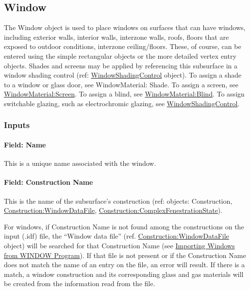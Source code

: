 \subsection{Window}\label{window}

The Window object is used to place windows on surfaces that can have windows, including exterior walls, interior walls, interzone walls, roofs, floors that are exposed to outdoor conditions, interzone ceiling/floors. These, of course, can be entered using the simple rectangular objects or the more detailed vertex entry objects. Shades and screens may be applied by referencing this subsurface in a window shading control (ref: \hyperref[windowpropertyshadingcontrol]{WindowShadingControl} object). To assign a shade to a window or glass door, see WindowMaterial: Shade. To assign a screen, see \hyperref[windowmaterialscreen]{WindowMaterial:Screen}. To assign a blind, see \hyperref[windowmaterialblind]{WindowMaterial:Blind}. To assign switchable glazing, such as electrochromic glazing, see \hyperref[windowpropertyshadingcontrol]{WindowShadingControl}.


\subsubsection{Inputs}\label{inputs-14-016}

\paragraph{Field: Name}\label{field-name-10-018}

This is a unique name associated with the window.

\paragraph{Field: Construction Name}\label{field-construction-name-10}

This is the name of the subsurface's construction (ref: objects: Construction, \hyperref[constructionwindowdatafile]{Construction:WindowDataFile}, \hyperref[constructioncomplexfenestrationstate]{Construction:ComplexFenestrationState}).

For windows, if Construction Name is not found among the constructions on the input (.idf) file, the ``Window data file'' (ref. \hyperref[constructionwindowdatafile]{Construction:WindowDataFile} object) will be searched for that Construction Name (see \hyperref[importing-windows-from-window-program]{Importing Windows from WINDOW Program}). If that file is not present or if the Construction Name does not match the name of an entry on the file, an error will result. If there is a match, a window construction and its corresponding glass and gas materials will be created from the information read from the file.

